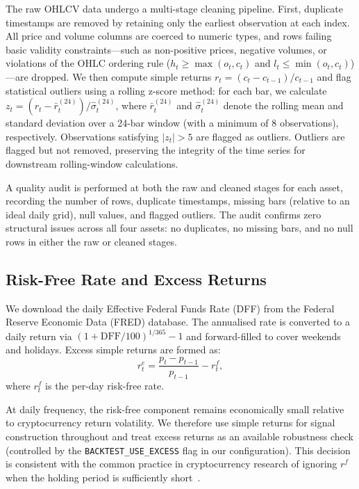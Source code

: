 \documentclass[11pt,a4paper]{article}
\newcommand{\abs}[1]{\lvert #1 \rvert}
\begin{document}
The raw OHLCV data undergo a multi-stage cleaning pipeline.  First, duplicate timestamps are removed by retaining only the earliest observation at each index.  All price and volume columns are coerced to numeric types, and rows failing basic validity constraints---such as non-positive prices, negative volumes, or violations of the OHLC ordering rule ($h_t \geq \max(o_t, c_t)$ and $l_t \leq \min(o_t, c_t)$)---are dropped.  We then compute simple returns $r_t = (c_t - c_{t-1})/c_{t-1}$ and flag statistical outliers using a rolling z-score method: for each bar, we calculate $z_t = (r_t - \bar{r}_t^{(24)}) / \hat{\sigma}_t^{(24)}$, where $\bar{r}_t^{(24)}$ and $\hat{\sigma}_t^{(24)}$ denote the rolling mean and standard deviation over a 24-bar window (with a minimum of 8 observations), respectively.  Observations satisfying $\abs{z_t} > 5$ are flagged as outliers.  Outliers are flagged but not removed, preserving the integrity of the time series for downstream rolling-window calculations.

A quality audit is performed at both the raw and cleaned stages for each asset, recording the number of rows, duplicate timestamps, missing bars (relative to an ideal daily grid), null values, and flagged outliers.  The audit confirms zero structural issues across all four assets: no duplicates, no missing bars, and no null rows in either the raw or cleaned stages.

\subsection{Risk-Free Rate and Excess Returns}

We download the daily Effective Federal Funds Rate (DFF) from the Federal Reserve Economic Data (FRED) database.  The annualised rate is converted to a daily return via $(1 + \text{DFF}/100)^{1/365} - 1$ and forward-filled to cover weekends and holidays.  Excess simple returns are formed as:
\begin{equation}
  r^e_t = \frac{p_t - p_{t-1}}{p_{t-1}} - r^f_{t},
  \label{eq:excess-return}
\end{equation}
where $r^f_{t}$ is the per-day risk-free rate.

At daily frequency, the risk-free component remains economically small relative to cryptocurrency return volatility.  We therefore use simple returns for signal construction throughout and treat excess returns as an available robustness check (controlled by the \texttt{BACKTEST\_USE\_EXCESS} flag in our configuration).  This decision is consistent with the common practice in cryptocurrency research of ignoring $r^f$ when the holding period is sufficiently short~\cite{liu2021}.
\end{document}

